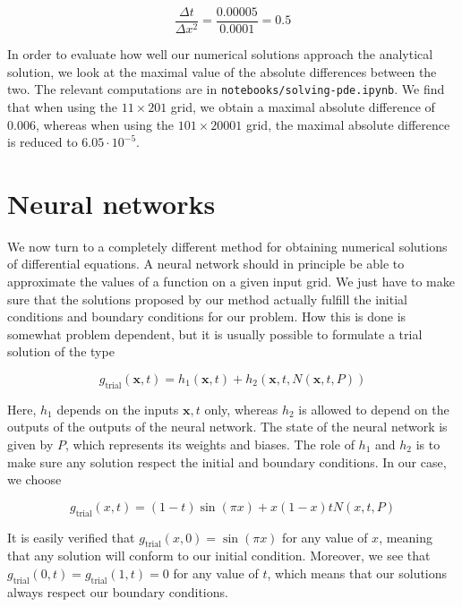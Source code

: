 \documentclass{article}
\begin{document}
\begin{equation}
    \frac{\Delta t}{\Delta x^2} = \frac{0.00005}{0.0001}=0.5
\end{equation}

In order to evaluate how well our numerical solutions approach the analytical solution, we look at the maximal value of the absolute differences between the two. The relevant computations are in \texttt{notebooks/solving-pde.ipynb}. We find that when using the $11 \times 201$ grid, we obtain a maximal absolute difference of 0.006, whereas when using the $101 \times 20001$ grid, the maximal absolute difference is reduced to $6.05 \cdot 10^{-5}$.

\section{Neural networks}
We now turn to a completely different method for obtaining numerical solutions of differential equations. A neural network should in principle be able to approximate the values of a function on a given input grid. We just have to make sure that the solutions proposed by our method actually fulfill the initial conditions and boundary conditions for our problem. How this is done is somewhat problem dependent, but it is usually possible to formulate a trial solution of the type

\begin{equation}
    g_{\textrm{trial}}(\mathbf{x}, t) = h_1(\mathbf{x}, t) + h_2(\mathbf{x}, t, N(\mathbf{x}, t, P))
\end{equation}

Here, $h_1$ depends on the inputs $\mathbf{x}, t$ only, whereas $h_2$ is allowed to depend on the outputs of the outputs of the neural network. The state of the neural network is given by $P$, which represents its weights and biases. The role of $h_1$ and $h_2$ is to make sure any solution respect the initial and boundary conditions. In our case, we choose

\begin{equation}
    g_{\textrm{trial}}(x, t) = (1 - t)\sin(\pi x) + x(1 - x) t N(x, t, P)
\end{equation}

It is easily verified that $g_{\textrm{trial}}(x, 0) = \sin(\pi x)$ for any value of $x$, meaning that any solution will conform to our initial condition. Moreover, we see that $g_{\textrm{trial}}(0, t) = g_{\textrm{trial}}(1, t) = 0$ for any value of $t$, which means that our solutions always respect our boundary conditions.
\end{document}

